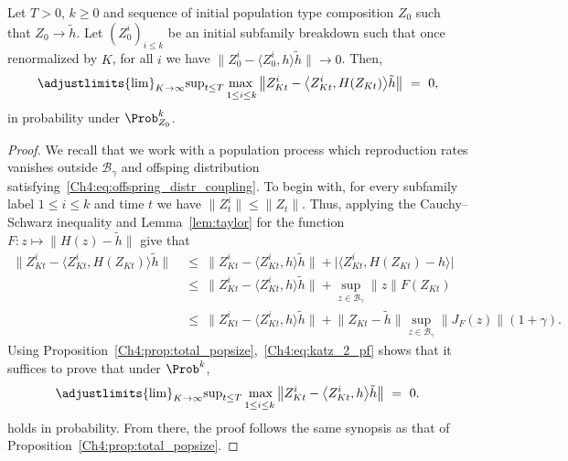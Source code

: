 \begin{refsegment}
\begin{lem}\label{lem:PF_projection}
Let $T>0$, $k\geq 0$ and sequence of initial population type composition $Z_0$ such that $Z_0\to \tilde h$. Let $(Z^i_0)_{i\leq k}$ be an initial subfamily breakdown such that once renormalized by $K$, for all $i$ we have $\lVert  Z^i_0 - \langle  Z^i_{0}, h\rangle\tilde h \rVert\to 0$. Then,
   \[
 \adjustlimits{\lim}_{K\to\infty}{\sup}_{t\leq T}\mathop{\max \vphantom{p}}_{1\leq i\leq k}  \big\lVert  Z^i_{Kt} - \big\langle Z^i_{Kt}, H( Z_{Kt}) \big\rangle\tilde h \big\rVert \ =\ 0,
 \]
in probability under $\Prob^k_{Z_0}$.
\end{lem}
\begin{proof}
  We recall that we work with a population process which reproduction rates vanishes outside $\mathscr{B}_{\gamma}$ and offsping distribution satisfying~\eqref{Ch4:eq:offspring_distr_coupling}.
To begin with, for every subfamily label $1\leq i\leq k$ and time $t$ we have $\lVert Z^i_{t}\rVert \leq \lVert Z_{t}\rVert$. Thus, applying the Cauchy--Schwarz inequality and Lemma~\ref{lem:taylor} for the function $F:z\mapsto \lVert H(z)-\tilde h\rVert$ give that 
\begin{equation}\label{Ch4:eq:katz_2_pf}
  \begin{aligned}
\big\lVert Z^i_{Kt} - \big\langle  Z^i_{Kt}, H( Z_{Kt}) \big\rangle\tilde h \big\rVert\ &\leq\   \big\lVert  Z^i_{Kt} - \big\langle  Z^i_{Kt}, h \big\rangle\tilde h \big\rVert
   +   \big|  \big\langle  Z^i_{Kt}, H( Z_{Kt})- h \big\rangle  \big|\\
   &\leq\ \big\lVert  Z^i_{Kt} - \big\langle  Z^i_{Kt}, h \big\rangle\tilde h \big\rVert
   +  \sup_{z\in \mathscr{B}_\gamma} \lVert z \rVert F(Z_{Kt})\\
   &\leq\ \big\lVert  Z^i_{Kt} - \big\langle  Z^i_{Kt}, h \big\rangle\tilde h \big\rVert 
   + \big\lVert  Z_{Kt} -\tilde h \big\rVert     \sup_{z\in \mathscr{B}_\gamma}\big\lVert J_F(z)\big\rVert (1+\gamma).
\end{aligned}
\end{equation}
Using Proposition~\ref{Ch4:prop:total_popsize},~\eqref{Ch4:eq:katz_2_pf} shows that it suffices to prove that  under $\Prob^k$,
   \[
 \adjustlimits{\lim}_{K\to\infty}{\sup}_{t\leq  T}\mathop{\vphantom{p}\max}_{1\leq i\leq k}  \big\lVert  Z^i_{Kt} - \big\langle  Z^i_{Kt}, h \big\rangle\tilde h \big\rVert \ =\ 0.
 \]
holds in probability.
   From there, the proof follows the same synopsis as that of Proposition~\ref{Ch4:prop:total_popsize}.


\end{proof}
\end{refsegment}
